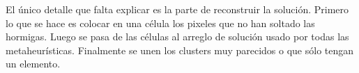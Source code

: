 El \'unico detalle que falta explicar es la parte de reconstruir la soluci\'on.
Primero lo que se hace es colocar en una c\'elula los pixeles
que no han soltado las hormigas. Luego se pasa de las c\'elulas al 
arreglo de soluci\'on usado por todas las metaheur\'isticas. Finalmente
se unen los clusters muy parecidos o que s\'olo tengan un elemento.


